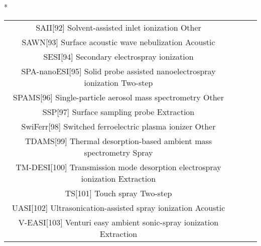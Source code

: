 \begin{table}{*}
\begin{tabular}{|c|c|c|l|}
SAII[92] Solvent-assisted inlet ionization Other \\
SAWN[93] Surface acoustic wave nebulization Acoustic \\
SESI[94] Secondary electrospray ionization  \\
SPA-nanoESI[95] Solid probe assisted nanoelectrospray ionization Two-step \\
SPAMS[96] Single-particle aerosol mass spectrometry Other \\
SSP[97] Surface sampling probe Extraction \\
SwiFerr[98] Switched ferroelectric plasma ionizer Other \\
    TDAMS[99] Thermal desorption-based ambient mass spectrometry Spray \\
    TM-DESI[100] Transmission mode desorption electrospray ionization Extraction \\
    TS[101] Touch spray Two-step \\
    UASI[102] Ultrasonication-assisted spray ionization Acoustic \\
    V-EASI[103] Venturi easy ambient sonic-spray ionization Extraction \\

    \end{tabular} 
\end{table}